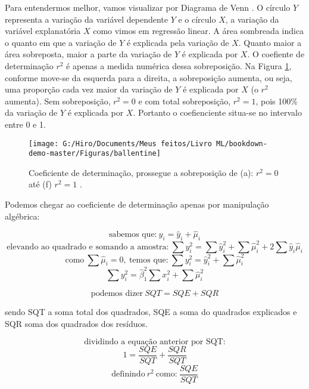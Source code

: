 \documentclass[
]{book}
\begin{document}
Para entendermos melhor, vamos visualizar por Diagrama de Venn \citep{kennedy1981ballentine}. O círculo \(Y\) representa a variação da variável dependente \(Y\) e o círculo \(X\), a variação da variável explanatória \(X\) como vimos em regressão linear. A área sombreada indica o quanto em que a variação de \(Y\) é explicada pela variação de \(X\). Quanto maior a área sobreposta, maior a parte da variação de \(Y\) é explicada por \(X\). O coefiente de determinação \(r^2\) é apenas a medida numérica dessa sobreposição. Na Figura \ref{fig:ballentine}, conforme move-se da esquerda para a direita, a sobreposição aumenta, ou seja, uma proporção cada vez maior da variação de \(Y\)
é explicada por \(X\) (o \(r^2\) aumenta). Sem sobreposição, \(r^2=0\) e com total sobreposição, \(r^2=1\), pois 100\% da variação de \(Y\) é explicada por \(X\). Portanto o coefienciente situa-se no intervalo entre 0 e 1.

\begin{figure}

{\centering \texttt{[image: G:/Hiro/Documents/Meus feitos/Livro ML/bookdown-demo-master/Figuras/ballentine]} 

}

\caption{Coeficiente de determinação, prossegue a sobreposição de (a): \(r^2=0\) até (f) \(r^2=1\) \citep{gujarati2011econometria}.}\label{fig:ballentine}
\end{figure}



Podemos chegar ao coeficiente de determinação apenas por manipulação algébrica:

\[\mbox{sabemos que:} \ y_i=\hat{y}_i+\hat{\mu}_i\]
\[\mbox{elevando ao quadrado e somando a amostra:} \ \sum y^2_i=\sum \hat{y}^2_i+\sum \hat{\mu}^2_i+2\sum \hat{y}_i \hat{\mu}_i \]
\[\mbox{como} \ \sum \hat{\mu}_i=0, \ \mbox{temos que:}\ \sum y^2_i= \hat{y}^2_i+\sum \hat{\mu}^2_i \]
\[\sum y^2_i=\hat{\beta}^2_1 \sum x_i^2+\sum \hat{\mu}^2_i \]

\begin{equation}
    \mbox{podemos dizer} \ SQT=SQE+SQR
    \label{eq:sqt}
\end{equation}

sendo SQT a soma total dos quadrados, SQE a soma do quadrados explicados e SQR soma dos quadrados dos resíduos.

\[\mbox{dividindo a equação anterior por SQT:}\]
\[1=\frac{SQE}{SQT}+\frac{SQR}{SQT} \]
\[\mbox{definindo}\ r^2 \ \mbox{como:} \ \frac{SQE}{SQT} \]
\end{document}
